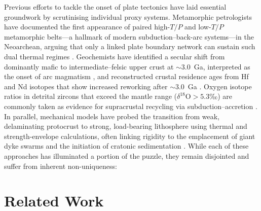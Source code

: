 \documentclass{article}
\begin{document}
Previous efforts to tackle the onset of plate tectonics have laid essential groundwork by scrutinising individual proxy systems.  Metamorphic petrologists have documented the first appearance of paired high-$T/P$ and low-$T/P$ metamorphic belts—a hallmark of modern subduction–back-arc systems—in the Neoarchean, arguing that only a linked plate boundary network can sustain such dual thermal regimes \cite{brown2006duality,holder2019paired}.  Geochemists have identified a secular shift from dominantly mafic to intermediate–felsic upper crust at $\sim3.0$~Ga, interpreted as the onset of arc magmatism \cite{tang2016archean}, and reconstructed crustal residence ages from Hf and Nd isotopes that show increased reworking after $\sim3.0$~Ga \cite{dhuime2012change,hawkesworth2006evolution}.  Oxygen isotope ratios in detrital zircons that exceed the mantle range ($\delta^{18}\text{O} > 5.3$‰) are commonly taken as evidence for supracrustal recycling via subduction–accretion \cite{valley2005oxygen,bindeman2008oxygen,spencer2022zircon}.  In parallel, mechanical models have probed the transition from weak, delaminating protocrust to strong, load-bearing lithosphere using thermal and strength-envelope calculations, often linking rigidity to the emplacement of giant dyke swarms and the initiation of cratonic sedimentation \cite{rey2008lithospheric,sizova2010contrasting,kusky2007archean}.  While each of these approaches has illuminated a portion of the puzzle, they remain disjointed and suffer from inherent non-uniqueness:

\section{Related Work}
\end{document}
